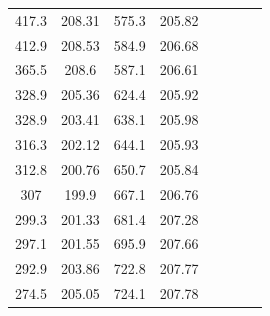 \begin{center}
\begin{tabular}{|cccc||cc||cc|}
    417.3    & 208.31                   & 575.3 & 205.82                        &        &                                       &          &                                     \\
    412.9    & 208.53                   & 584.9 & 206.68                        &        &                                       &          &                                     \\
    365.5    & 208.6                    & 587.1 & 206.61                        &        &                                       &          &                                     \\
    328.9    & 205.36                   & 624.4 & 205.92                        &        &                                       &          &                                     \\
    328.9    & 203.41                   & 638.1 & 205.98                        &        &                                       &          &                                     \\
    316.3    & 202.12                   & 644.1 & 205.93                        &        &                                       &          &                                     \\
    312.8    & 200.76                   & 650.7 & 205.84                        &        &                                       &          &                                     \\
    307      & 199.9                    & 667.1 & 206.76                        &        &                                       &          &                                     \\
    299.3    & 201.33                   & 681.4 & 207.28                        &        &                                       &          &                                     \\
    297.1    & 201.55                   & 695.9 & 207.66                        &        &                                       &          &                                     \\
    292.9    & 203.86                   & 722.8 & 207.77                        &        &                                       &          &                                     \\
    274.5    & 205.05                   & 724.1 & 207.78                        &        &                                       &          &                                     \\

\end{tabular}
\end{center}
